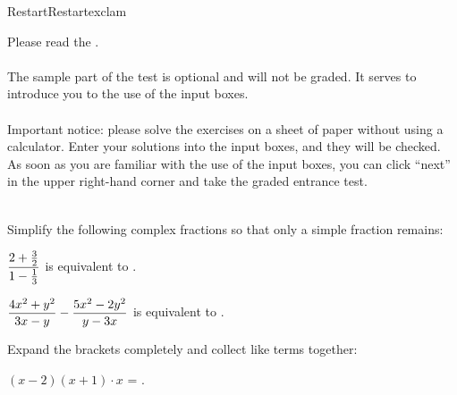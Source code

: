 
\begin{MXContent}{Restart}{Restart}{exclam}

Please read the .
\ \\ \ \\
The sample part of the test is optional and  will not be graded. It serves to introduce you to the use of the input boxes.
\ \\ \ \\
Important notice: please solve the exercises on a sheet of paper without using a calculator. Enter your solutions into the input boxes, and they will be checked. As soon as you are familiar with the use of the input boxes, you can click ``next'' in the upper right-hand corner and take the graded entrance test.
\ \\ \ \\

\begin{MExercise}
Simplify the following complex fractions so that only a simple fraction remains:
\begin{MExerciseItems}
\item{$\dfrac{2+\frac32}{1-\frac13}$ is equivalent to .\\}
\item{$\dfrac{4x^2+y^2}{3x-y}-\dfrac{5x^2-2y^2}{y-3x}$ is equivalent to .\\}
\end{MExerciseItems}
\end{MExercise}

\begin{MExercise}
Expand the brackets completely and collect like terms together:

$(x-2)(x+1)\cdot x$ = .

\end{MExercise}


\end{MXContent}

